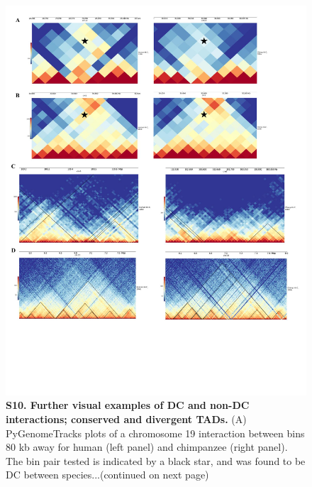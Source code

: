 \begin{figure}[!htb]
\centering
\includegraphics[width=6in]{img/figS10.1.pdf}
\caption[Further visual examples of DC and non-DC interactions; conserved and divergent TADs.]{\textbf{S10. Further visual examples of DC and non-DC interactions; conserved and divergent TADs.} (A) PyGenomeTracks plots \cite{Ramirez.2018} of a chromosome 19 interaction between bins 80 kb away for human (left panel) and chimpanzee (right panel). The bin pair tested is indicated by a black star, and was found to be DC between species...(continued on next page)}
\label{fig:ch02-figS10}
\end{figure}

